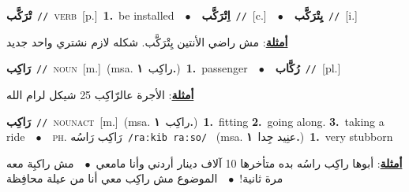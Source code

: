 \documentclass[10pt,a4paper,twoside]{article} %
\begin{document}
\begin{multicols}{2}
{\setlength\topsep{0pt}\textbf{\foreignlanguage{arabic}{تْرَكَّب}}\ {\color{gray}\texttt{//}\color{black}}\ \textsc{verb}\ [p.]\ \textbf{1.}~be installed\ \ $\bullet$\ \ \setlength\topsep{0pt}\textbf{\foreignlanguage{arabic}{اِتْرَكَّب}}\ {\color{gray}\texttt{//}\color{black}}\ [c.]\ \ $\bullet$\ \ \setlength\topsep{0pt}\textbf{\foreignlanguage{arabic}{يِتْرَكَّب}}\ {\color{gray}\texttt{//}\color{black}}\ [i.]\  \begin{flushright}\color{gray}\foreignlanguage{arabic}{\textbf{\underline{\foreignlanguage{arabic}{أمثلة}}}: مش راضي الأنتين يِتْرَكَّب. شكله لازم نشتري واحد جديد}\end{flushright}\color{black}} \vspace{2mm}

{\setlength\topsep{0pt}\textbf{\foreignlanguage{arabic}{رَاكِب}}\ {\color{gray}\texttt{//}\color{black}}\ \textsc{noun}\ [m.]\ \color{gray}(msa. \foreignlanguage{arabic}{راكِب}~\foreignlanguage{arabic}{\textbf{١.}})\color{black}\ \textbf{1.}~passenger\ \ $\bullet$\ \ \setlength\topsep{0pt}\textbf{\foreignlanguage{arabic}{رُكَّاب}}\ {\color{gray}\texttt{//}\color{black}}\ [pl.]\  \begin{flushright}\color{gray}\foreignlanguage{arabic}{\textbf{\underline{\foreignlanguage{arabic}{أمثلة}}}: الأجرة عالرّاكِب 25 شيكل لرام الله}\end{flushright}\color{black}} \vspace{2mm}

{\setlength\topsep{0pt}\textbf{\foreignlanguage{arabic}{رَاكِب}}\ {\color{gray}\texttt{//}\color{black}}\ \textsc{noun\textunderscore act}\ [m.]\ \color{gray}(msa. \foreignlanguage{arabic}{راكِب}~\foreignlanguage{arabic}{\textbf{١.}})\color{black}\ \textbf{1.}~fitting  \textbf{2.}~going along.  \textbf{3.}~taking a ride\ \ $\bullet$\ \ \textsc{ph.} \color{gray} \foreignlanguage{arabic}{رَاكِب رَاسُه}\color{black}\ {\color{gray}\texttt{/{\sffamily raːkib raːso}/}\color{black}}\ \color{gray} (msa. \foreignlanguage{arabic}{عنِيد جِدا}~\foreignlanguage{arabic}{\textbf{١.}})\color{black}\ \textbf{1.}~very stubborn\  \begin{flushright}\color{gray}\foreignlanguage{arabic}{\textbf{\underline{\foreignlanguage{arabic}{أمثلة}}}: أبوها راكِب راسُه بده متأخرها 10 آلاف دينار أردني وأنا مامعي\ $\bullet$\ \  مش راكبِة معه مرة ثانية!\ $\bullet$\ \  الموضوع مش راكِب معي أنا من عيلة محافِظة}\end{flushright}\color{black}} \vspace{2mm}


\end{multicols}
\end{document}
